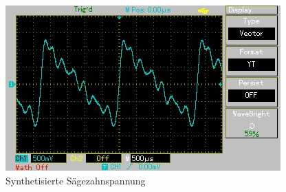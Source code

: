\begin{figure}[h!]
	\centering
	\includegraphics[scale=0.8]{Grafiken/Saegezahnspannung.jpg}
	\caption{Synthetisierte Sägezahnspannung}	
	\label{fig:Säge}
\end{figure}
\hspace*{4cm}